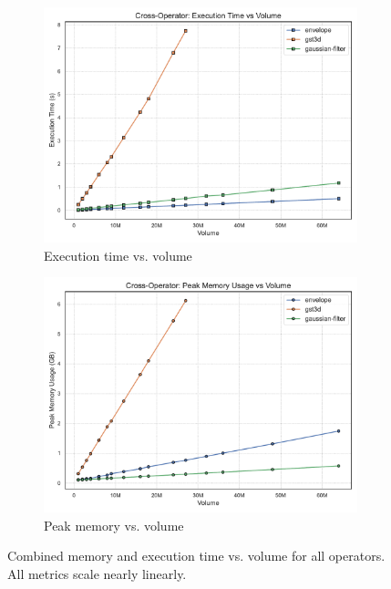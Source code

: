 \begin{figure}[htbp]
    \centering
    \begin{subfigure}[t]{0.49\textwidth}
        \includegraphics[width=\textwidth]{assets/images/05/cross_execution_time_by_volume}
        \caption{Execution time vs. volume}
    \end{subfigure}
    \hfill
    \begin{subfigure}[t]{0.49\textwidth}
        \includegraphics[width=\textwidth]{assets/images/05/cross_peak_memory_by_volume}
        \caption{Peak memory vs. volume}
    \end{subfigure}
    \caption{Combined memory and execution time vs. volume for all operators. All metrics scale nearly linearly.}
    \label{fig:ex_peak_mu_facet}
\end{figure}

